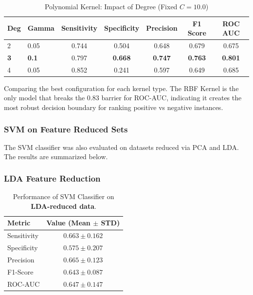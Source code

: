 \documentclass[12pt,a4paper]{article}
\begin{document}
\begin{table}[h!]
\centering
\begin{tabular}{llccccc}
\toprule
\textbf{Deg} & \textbf{Gamma} & \textbf{Sensitivity} & \textbf{Specificity} & \textbf{Precision} & \textbf{F1 Score} & \textbf{ROC AUC} \\
\midrule
2 & 0.05 & 0.744 & 0.504 & 0.648 & 0.679 & 0.675 \\
\rowcolor{gray!10} \textbf{3} & \textbf{0.1} & 0.797 & \textbf{0.668} & \textbf{0.747} & \textbf{0.763} & \textbf{0.801} \\
4 & 0.05 & 0.852 & 0.241 & 0.597 & 0.649 & 0.685 \\
\bottomrule
\end{tabular}
\caption{Polynomial Kernel: Impact of Degree (Fixed $C=10.0$)}
\end{table}

Comparing the best configuration for each kernel type. The RBF Kernel is the only model that breaks the 0.83 barrier for ROC-AUC, indicating it creates the most robust decision boundary for ranking positive vs negative instances.

\subsubsection*{SVM on Feature Reduced Sets}
The SVM classifier was also evaluated on datasets reduced via PCA and LDA. The results are summarized below.

\subsubsection*{LDA Feature Reduction}
\begin{table}[H]
    \centering
    \begin{tabular}{lc}
        \toprule
        \textbf{Metric} & \textbf{Value (Mean $\pm$ STD)} \\
        \midrule
        Sensitivity & $0.663 \pm 0.162$ \\
        Specificity & $0.575 \pm 0.207$ \\
        Precision & $0.665 \pm 0.123$ \\
        F1-Score & $0.643 \pm 0.087$ \\
        ROC-AUC & $0.647 \pm 0.147$ \\
        \bottomrule
    \end{tabular}
    \caption{Performance of SVM Classifier on \textbf{LDA-reduced data}.}
    \label{tab:svm_lda_metrics}
\end{table}
\end{document}
